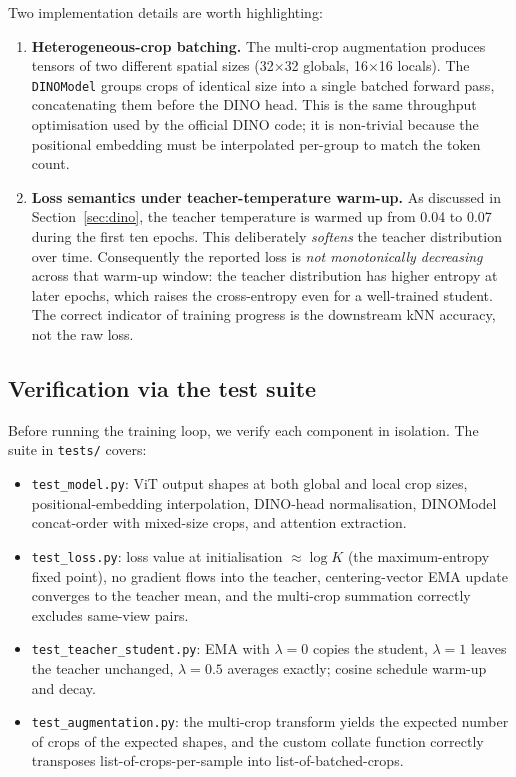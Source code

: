 \documentclass[11pt,a4paper]{article}
\begin{document}
Two implementation details are worth highlighting:

\begin{enumerate}[leftmargin=*]
\item \textbf{Heterogeneous-crop batching.}
The multi-crop augmentation produces tensors of two different spatial
sizes (32$\times$32 globals, 16$\times$16 locals). The \texttt{DINOModel}
groups crops of identical size into a single batched forward pass,
concatenating them before the DINO head. This is the same throughput
optimisation used by the official DINO code; it is non-trivial because
the positional embedding must be interpolated per-group to match the
token count.

\item \textbf{Loss semantics under teacher-temperature warm-up.}
As discussed in Section~\ref{sec:dino}, the teacher temperature is
warmed up from 0.04 to 0.07 during the first ten epochs. This
deliberately \emph{softens} the teacher distribution over time.
Consequently the reported loss is \emph{not monotonically decreasing}
across that warm-up window: the teacher distribution has higher entropy
at later epochs, which raises the cross-entropy even for a well-trained
student. The correct indicator of training progress is the downstream
kNN accuracy, not the raw loss.
\end{enumerate}

\subsection{Verification via the test suite}

Before running the training loop, we verify each component in isolation.
The suite in \texttt{tests/} covers:

\begin{itemize}[leftmargin=*]
  \item \texttt{test\_model.py}: ViT output shapes at both global and local
  crop sizes, positional-embedding interpolation, DINO-head normalisation,
  DINOModel concat-order with mixed-size crops, and attention extraction.
  \item \texttt{test\_loss.py}: loss value at initialisation
  $\approx \log K$ (the maximum-entropy fixed point), no gradient flows
  into the teacher, centering-vector EMA update converges to the teacher
  mean, and the multi-crop summation correctly excludes same-view pairs.
  \item \texttt{test\_teacher\_student.py}: EMA with $\lambda=0$ copies
  the student, $\lambda=1$ leaves the teacher unchanged, $\lambda=0.5$
  averages exactly; cosine schedule warm-up and decay.
  \item \texttt{test\_augmentation.py}: the multi-crop transform yields
  the expected number of crops of the expected shapes, and the custom
  collate function correctly transposes list-of-crops-per-sample into
  list-of-batched-crops.
\end{itemize}
\end{document}
